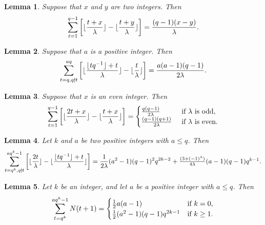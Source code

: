 \documentclass[journal,onecolumn]{IEEEtran}
\newtheorem{lemma}{Lemma}
\begin{document}
\begin{lemma}\label{le0}
 Suppose that   $x$ and $y$ are two integers. Then  
 \begin{equation}\notag
  \sum\limits_{t=1}^{q-1}\left [\lfloor \frac{t+x}{\lambda}\rfloor- \lfloor \frac{t+y}{\lambda}\rfloor \right] =\frac{(q-1)(x-y)}{\lambda}.
\end{equation}  
\end{lemma}


 
\begin{lemma}\label{adl}
Suppose that $a $ is a positive  integer. Then  
 \begin{equation}\notag
  \sum\limits_{t=q, q\nmid t }^{aq}\left [\lfloor \frac{\lfloor tq^{-1}\rfloor+t}{\lambda}\rfloor- \lfloor \frac{t}{\lambda}\rfloor \right] =\frac{a(a-1)(q-1)}{2\lambda}.
\end{equation}  
\end{lemma}


\begin{lemma}\label{ll9}  Suppose that $x$ is an even integer. Then
\begin{equation}\notag
{\sum\limits_{t=1}^{q-1}\left[\lfloor \frac{2t+x}{\lambda}\rfloor- \lfloor \frac{t+x}{\lambda}\rfloor\right]} =
  \begin{cases}
  \frac{q(q-1)}{2\lambda}&\hbox{ if $\lambda$ is odd},\\
    \frac{(q-1)(q+1)}{2\lambda}&\hbox{ if $\lambda$ is even}.\\
  \end{cases} 
\end{equation}
\end{lemma}

\begin{lemma}\label{lema12}
Let $k$ and $a$   be two positive integers with $a\leq q$.   
    Then 
\begin{equation}\notag
     \sum\limits_{t=q^{k},q\nmid t}^{aq^{k}-1}\left[\lfloor \frac{2t}{\lambda}\rfloor -\lfloor \frac{\lfloor tq^{-1}\rfloor+t}{\lambda}\rfloor \right]= {\frac{1}{2\lambda}(a^2-1)(q-1)^2q^{2k-2}}+\textstyle{\frac{(3+(-1)^{\lambda})}{4\lambda}(a-1)(q-1)q^{k-1}}.
 \end{equation} 
\end{lemma}




\begin{lemma}\label{lead2}
Let $k$ be an integer, and let $a$ be  a positive   integer with $a\leq q $.  
Then 
\begin{equation}\notag
\sum\limits_{t=q^{k}}^{aq^{k}-1}N(t+1)=
\begin{cases}
\frac{1}{2}a(a-1) &\hbox{if } k=0,\\
\frac{1}{2}(a^2-1)(q-1)q^{2k-1} &\hbox{if }  k \geq 1.\\
\end{cases}
\end{equation}
\end{lemma}
\end{document}
